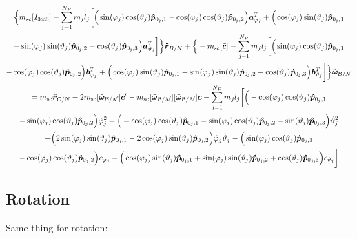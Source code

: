\documentclass[]{BasiliskReportMemo}
\begin{document}
\begin{multline}
	\Big\{m_{\text{sc}}[I_{3\times3}] -\sum_{j=1}^{N_{P}}m_j l_j \bigg[
	\Big(\sin(\varphi_j)\cos(\vartheta_j)\bm{\hat{p}}_{0_j,1}-\cos(\varphi_j)\cos(\vartheta_j)\bm{\hat{p}}_{0_j,2}\Big)\bm a_{\varphi_j}^T +\Big(\cos(\varphi_j)\sin(\vartheta_j)\bm{\hat{p}}_{0_j,1}\\+\sin(\varphi_j)\sin(\vartheta_j)\bm{\hat{p}}_{0_j,2}+\cos(\vartheta_j)\bm{\hat{p}}_{0_j,3}\Big)\bm a_{\vartheta_j}^T \bigg]\Big\}\ddot{\bm r}_{B/N}
	+\Big\{-m_{\text{sc}}[\tilde{\bm{c}}] -\sum_{j=1}^{N_{P}}m_j l_j \bigg[
	\Big(\sin(\varphi_j)\cos(\vartheta_j)\bm{\hat{p}}_{0_j,1}\\-\cos(\varphi_j)\cos(\vartheta_j)\bm{\hat{p}}_{0_j,2}\Big)\bm b_{\varphi_j}^T +\Big(\cos(\varphi_j)\sin(\vartheta_j)\bm{\hat{p}}_{0_j,1}+\sin(\varphi_j)\sin(\vartheta_j)\bm{\hat{p}}_{0_j,2}+\cos(\vartheta_j)\bm{\hat{p}}_{0_j,3}\Big)\bm b_{\vartheta_j}^T \bigg] \Big\}\dot{\bm\omega}_{\cal B/N}
	\\= m_{\text{sc}}\ddot{\bm r}_{C/N} - 2m_{\text{sc}}[\tilde{\bm\omega}_{\cal B/N}] \bm c'
	-m_{\text{sc}}[\tilde{\bm\omega}_{\cal B/N}][\tilde{\bm\omega}_{\cal B/N}]\bm{c}
	-\sum_{j=1}^{N_{P}}m_j l_j \bigg[ 
	\Big(-\cos(\varphi_j)\cos(\vartheta_j)\bm{\hat{p}}_{0_j,1}\\-\sin(\varphi_j)\cos(\vartheta_j)\bm{\hat{p}}_{0_j,2}\Big)\dot{\varphi}_j^2
	+\Big(-\cos(\varphi_j)\cos(\vartheta_j)\bm{\hat{p}}_{0_j,1}-\sin(\varphi_j)\cos(\vartheta_j)\bm{\hat{p}}_{0_j,2}+\sin(\vartheta_j)\bm{\hat{p}}_{0_j,3} \Big)\dot{\vartheta}_j^2 \\+
	\Big(2\sin(\varphi_j)\sin(\vartheta_j)\bm{\hat{p}}_{0_j,1} -2\cos(\varphi_j)\sin(\vartheta_j)\bm{\hat{p}}_{0_j,2}\Big)\dot{\varphi}_j\dot{\vartheta}_j
	-\Big(\sin(\varphi_j)\cos(\vartheta_j)\bm{\hat{p}}_{0_j,1}\\-\cos(\varphi_j)\cos(\vartheta_j)\bm{\hat{p}}_{0_j,2}\Big)c_{\varphi_j} - \Big(\cos(\varphi_j)\sin(\vartheta_j)\bm{\hat{p}}_{0_j,1}+\sin(\varphi_j)\sin(\vartheta_j)\bm{\hat{p}}_{0_j,2}+\cos(\vartheta_j)\bm{\hat{p}}_{0_j,3}\Big) c_{\vartheta_j} 
	\bigg]
	\label{eq:Rbddot7}
\end{multline}
	
	\subsection{Rotation}
	
Same thing for rotation: 
	
\end{document}
